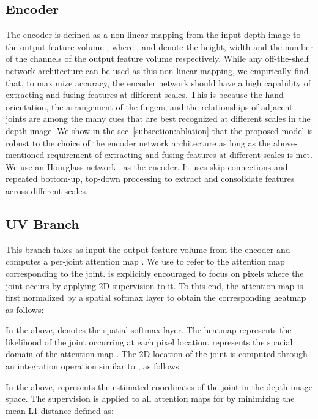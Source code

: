\documentclass{article}
\begin{document}
\subsection{Encoder} \label{subsection:encoder}
The encoder is defined as a non-linear mapping from the input depth image to the output feature volume , where ,  and  denote the height, width and the number of the channels of the output feature volume respectively. While any off-the-shelf network architecture can be used as this non-linear mapping, we empirically find that, to maximize accuracy, the encoder network should have a high capability of extracting and fusing features at different scales. This is because the hand orientation, the arrangement of the fingers, and the relationships of adjacent joints are among the many cues that are best recognized at different scales in the depth image. We show in the sec~\ref{subsection:ablation} that the proposed model is robust to the choice of the encoder network architecture as long as the above-mentioned requirement of extracting and fusing features at different scales is met. We use an Hourglass network~\cite{newell2016stacked} as the encoder. It uses skip-connections and repeated bottom-up, top-down processing to extract and consolidate features across different scales. 

\subsection{UV Branch}
This branch takes as input the output feature volume from the encoder and computes a per-joint attention map . We use  to refer to the attention map corresponding to the  joint.  is explicitly encouraged to focus on pixels where the  joint occurs by applying 2D supervision to it. To this end, the attention map  is first normalized by a spatial softmax layer \cite{iqbal2018hand} to obtain the corresponding heatmap  as follows:



In the above,  denotes the spatial softmax layer. The heatmap  represents the likelihood of the  joint occurring at each pixel location.  represents the spacial domain of the attention map . The 2D location of the  joint is computed through an integration operation similar to \cite{sun2018integral,iqbal2018hand}, as follows: 




In the above,  represents the estimated coordinates of the  joint in the depth image space. The supervision is applied to all attention maps  for  by minimizing the mean L1 distance defined as:
\end{document}
